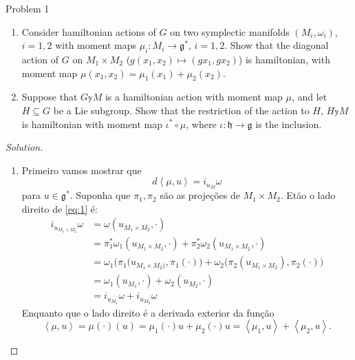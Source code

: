 \begin{thing1}{Problem 1}\leavevmode
\begin{enumerate}[label=\alph*.]
	\item Consider hamiltonian actions of $ G$ on two symplectic manifolds $(M_i,\omega_i)$, $i=1,2$ with moment maps $\mu_i:M_i\to \mathfrak{g}^*$, $i=1,2$. Show that the diagonal action of $G$ on $M_1\times M_2$ ($g(x_1,x_2)\mapsto (gx_1,gx_2)$) is hamiltonian, with moment map $\mu(x_1,x_2)=\mu_1(x_1)+\mu_2(x_2)$.

	\item Suppose that $G\mathbb{y} M$ is a hamiltonian action with moment map $ \mu$, and let $H\subseteq G$ be a Lie subgroup. Show that the restriction of the action to $H$,  $H\mathbb{y} M$ is hamiltonian with moment map $\iota^*\circ\mu$, where $\iota:\mathfrak{h}\to\mathfrak{g}$ is the inclusion.
\end{enumerate}

\begin{proof}[Solution]\leavevmode
	\begin{enumerate}[label=\alph*.]
		\item Primeiro vamos mostrar que
		\begin{equation}\label{eq:1}d\left<\mu, u\right> =i_{u_M}\omega \end{equation}
		para $u\in\mathfrak{g}^*$. Suponha que $\pi_1,\pi_2$ são as projeções de $M_1\times M_2$. Etão o lado direito de \cref{eq:1} é:
		\begin{align*}
			i_{u_{M_1\times M_2}}\omega&=\omega(u_{M_1\times M_2},\cdot)\\
			&=\pi^*_1\omega_1(u_{M_1\times M_2},\cdot)+\pi^*_2\omega_2(u_{M_1\times M_2},\cdot)\\
			&=\omega_1\Big(\pi_1(u_{M_1\times M_2)},\pi_1(\cdot)\Big)+\omega_2\Big(\pi_2(u_{M_1\times M_2}),\pi_2(\cdot)\Big)\\
			&=\omega_1(u_{M_1},\cdot)+\omega_2(u_{M_2},\cdot)\\
			&=i_{u_{M_1}}\omega+i_{u_{M_2}}\omega
		\end{align*}
	Enquanto que o lado direito é a derivada exterior da função
	\[\left<\mu,u\right> =\mu(\cdot)(u)=\mu_1(\cdot)u+\mu_2(\cdot)u=\left<\mu_1,u\right> +\left<\mu_2,u\right>.\]


\end{enumerate}
\end{proof}
\end{thing1}
